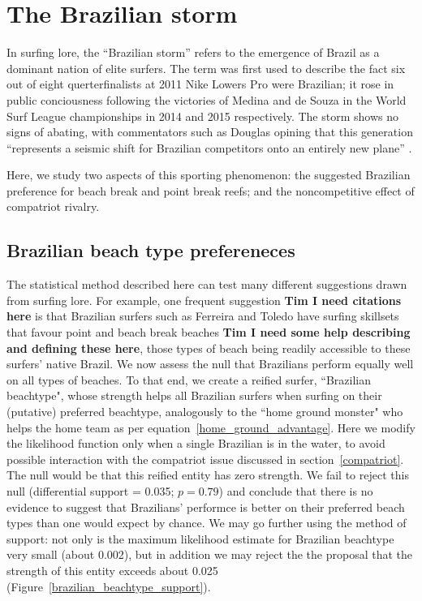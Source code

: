 \documentclass{article}
\begin{document}
\section{The Brazilian storm}

In surfing lore, the ``Brazilian storm'' refers to the emergence of
Brazil as a dominant nation of elite surfers.  The term was first used
to describe the fact six out of eight querterfinalists at 2011 Nike
Lowers Pro were Brazilian; it rose in public conciousness following
the victories of Medina and de Souza in the World Surf League
championships in 2014 and 2015 respectively.  The storm shows no signs
of abating, with commentators such as Douglas opining that this
generation ``represents a seismic shift for Brazilian competitors onto
an entirely new plane'' \cite{douglas2020}.

Here, we study two aspects of this sporting phenomenon: the suggested
Brazilian preference for beach break and point break reefs; and the
noncompetitive effect of compatriot rivalry.

\subsection{Brazilian beach type prefereneces}

The statistical method described here can test many different
suggestions drawn from surfing lore.  For example, one frequent
suggestion {\bf Tim I need citations here} is that Brazilian surfers
such as Ferreira and Toledo have surfing skillsets that favour point
and beach break beaches {\bf Tim I need some help describing and
  defining these here}, those types of beach being readily accessible
to these surfers' native Brazil.  We now assess the null that
Brazilians perform equally well on all types of beaches.  To that end,
we create a reified surfer, ``Brazilian beachtype", whose strength
helps all Brazilian surfers when surfing on their (putative) preferred
beachtype, analogously to the ``home ground monster" who helps the
home team as per equation~\ref{home_ground_advantage}.  Here we modify
the likelihood function only when a single Brazilian is in the water,
to avoid possible interaction with the compatriot issue discussed in
section~\ref{compatriot}.  The null would be that this reified entity
has zero strength.  We fail to reject this null (differential support
= 0.035; $p=0.79$) and conclude that there is no evidence to suggest
that Brazilians' performce is better on their preferred beach types
than one would expect by chance.  We may go further using the method
of support: not only is the maximum likelihood estimate for Brazilian
beachtype very small (about 0.002), but in addition we may reject the
the proposal that the strength of this entity exceeds about 0.025
(Figure~\ref{brazilian_beachtype_support}).
\end{document}
